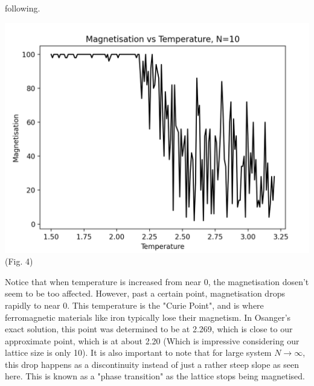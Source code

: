 \documentclass{article}
\begin{document}
 following.  
\begin{center}
    \includegraphics[scale=.5]{MagTemp_N=10.png}\\ 
    (Fig. 4)
\end{center}
Notice that when temperature is increased from near 0, the magnetisation dosen't seem to be too affected. However, 
past a certain point, magnetisation drops rapidly to near 0. This temperature is the "Curie Point", and 
is where ferromagnetic materials like iron typically lose their magnetism. In Osanger's 
exact solution, this point was determined to be at 2.269, which is close to our approximate
point, which is at about 2.20 (Which is impressive considering our lattice size is only 10).  It is also important to note that 
for large system $N\to\infty$, this drop happens as a discontinuity instead of just a rather steep slope as seen here. This is known as a "phase transition" as the 
lattice stops being magnetised. 
\end{document}
